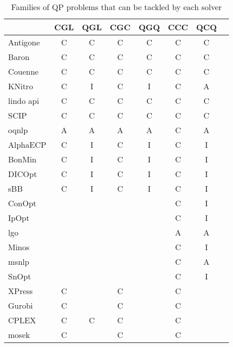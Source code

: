 \begin{table}
{
 \centering                
 \scriptsize                
 \setlength{\tabcolsep}{3pt}                
                
\begin{tabular}{lccccccc}
\toprule  
                 & CGL & QGL & CGC & QGQ & CCC & QCQ \\
\hline
{\sc Antigone}    &  C  &  C  &  C  &  C  &  C  &  C  \\
{\sc Baron}       &  C  &  C  &  C  &  C  &  C  &  C  \\
{\sc Couenne}     &  C  &  C  &  C  &  C  &  C  &  C  \\
{\sc KNitro}      &  C  &  I  &  C  &  I  &  C  &  A  \\
{\sc lindo api}   &  C  &  C  &  C  &  C  &  C  &  C  \\
{\sc SCIP}        &  C  &  C  &  C  &  C  &  C  &  C  \\
{\sc oqnlp}       &  A  &  A  &  A  &  A  &  C  &  A  \\
{\sc AlphaECP}    &  C  &  I  &  C  &  I  &  C  &  I  \\
{\sc BonMin}      &  C  &  I  &  C  &  I  &  C  &  I  \\
{\sc DICOpt}      &  C  &  I  &  C  &  I  &  C  &  I  \\
{\sc sBB}         &  C  &  I  &  C  &  I  &  C  &  I  \\
{\sc ConOpt}      &     &     &     &     &  C  &  I  \\
{\sc IpOpt}       &     &     &     &     &  C  &  I  \\
{\sc lgo}         &     &     &     &     &  A  &  A  \\
{\sc Minos}       &     &     &     &     &  C  &  I  \\
{\sc msnlp}       &     &     &     &     &  C  &  A  \\
{\sc SnOpt}       &     &     &     &     &  C  &  I  \\
{\sc XPress}      &  C  &     &  C  &     &  C  &     \\
{\sc Gurobi}      &  C  &     &  C  &     &  C  &     \\
{\sc CPLEX}       &  C  &  C  &  C  &     &  C  &     \\
{\sc mosek}       &  C  &     &  C  &     &  C  &     \\
\hline
\end{tabular}                 
\caption{Families of QP problems that can be tackled by each solver} \label{t:solvers}
}


\end{table}              

